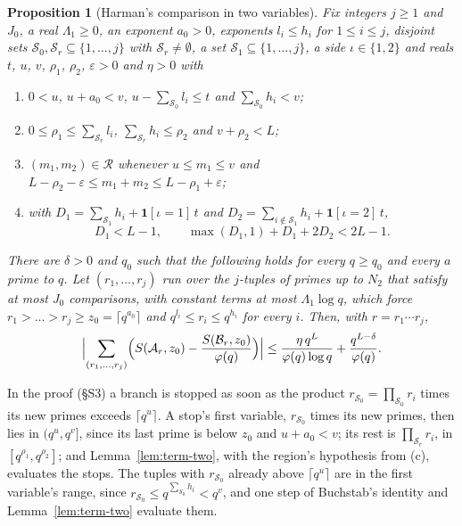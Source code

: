 \documentclass[11pt]{article}
\newtheorem{proposition}[theorem]{Proposition}
\theoremstyle{definition}
\begin{document}
\begin{proposition}[Harman's comparison in two variables]\label{prop:harman-two}
Fix integers $j \ge 1$ and $J_0$, a real $\Lambda_1 \ge 0$, an exponent $a_0 > 0$, exponents $l_i \le h_i$ for $1 \le
i \le j$,
disjoint sets $\mathcal S_0, \mathcal S_r \subseteq \{1, \dots, j\}$ with $\mathcal S_r \ne \emptyset$, a set
$\mathcal S_1 \subseteq \{1, \dots, j\}$, a side $\iota \in \{1, 2\}$ and reals $t$, $u$, $v$, $\rho_1$, $\rho_2$,
$\varepsilon > 0$ and $\eta > 0$ with
\begin{enumerate}
\item[(a)] $0 < u$, $u + a_0 < v$, $u - \sum_{\mathcal S_0} l_i \le t$ and $\sum_{\mathcal S_0} h_i < v$;
\item[(b)] $0 \le \rho_1 \le \sum_{\mathcal S_r} l_i$, $\sum_{\mathcal S_r} h_i \le \rho_2$ and $v + \rho_2 < L$;
\item[(c)] $(m_1, m_2) \in \mathcal R$ whenever $u \le m_1 \le v$ and $L - \rho_2 - \varepsilon \le m_1 + m_2 \le L -
  \rho_1 + \varepsilon$;
\item[(d)] with $D_1 = \sum_{\mathcal S_1} h_i + \mathbf 1[\iota = 1]\, t$ and $D_2 = \sum_{i \notin \mathcal S_1} h_i +
  \mathbf 1[\iota = 2]\, t$,
  \[
    D_1 < L - 1, \qquad \max(D_1, 1) + D_1 + 2D_2 < 2L - 1.
  \]
\end{enumerate}
There are $\delta > 0$ and $q_0$ such that the following holds for every $q \ge q_0$ and every $a$ prime to $q$. Let
$(r_1, \dots, r_j)$ run over the $j$-tuples of primes up to $N_2$ that satisfy at most $J_0$ comparisons, with constant
terms at most $\Lambda_1 \log q$, which force $r_1 > \dots > r_j \ge z_0 = \lceil q^{a_0} \rceil$ and $q^{l_i} \le r_i
\le
q^{h_i}$ for every $i$. Then, with $r = r_1 \cdots r_j$,
\[
  \Bigl|\sum_{(r_1, \dots, r_j)} \Bigl(S(\mathcal A_r, z_0) - \frac{S(\mathcal B_r, z_0)}{\varphi(q)}\Bigr)\Bigr|
  \le \frac{\eta\, q^L}{\varphi(q) \log q} + \frac{q^{L - \delta}}{\varphi(q)}.
\]
\end{proposition}

In the proof (\S S3) a branch is stopped as soon as the product $r_{\mathcal S_0} = \prod_{\mathcal S_0} r_i$ times
its new primes exceeds $\lceil q^u
\rceil$. A stop's
first variable, $r_{\mathcal S_0}$ times its new primes, then lies in $(q^u, q^v]$, since its last prime is below $z_0$
and $u + a_0 <
v$; its rest is $\prod_{\mathcal S_r} r_i$, in $[q^{\rho_1}, q^{\rho_2}]$; and Lemma~\ref{lem:term-two}, with the
region's hypothesis from (c), evaluates the stops. The tuples with $r_{\mathcal S_0}$ already above $\lceil q^u \rceil$
are in the
first variable's range, since $r_{\mathcal S_0} \le q^{\sum_{\mathcal S_0} h_i} < q^v$, and one step of Buchstab's
identity and
Lemma~\ref{lem:term-two} evaluate them.
\end{document}

